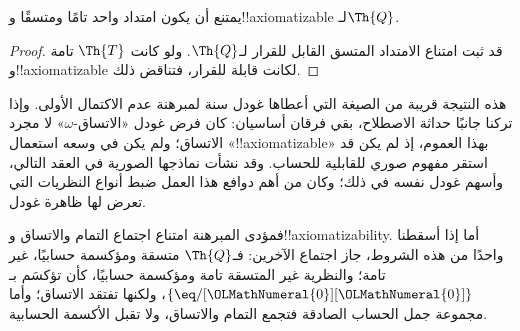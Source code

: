 \documentclass[../../../include/open-logic-section]{subfiles}
\begin{document}


\begin{thm}
يمتنع أن يكون امتداد واحد تامًا ومتسقًا و!!{axiomatizable}
لـ$\Th{Q}$.
\end{thm}

\begin{proof}
قد ثبت امتناع الامتداد المتسق القابل للقرار لـ$\Th{Q}$.
ولو كانت $\Th{T}$ تامة و!!{axiomatizable} لكانت قابلة للقرار،
فتناقض ذلك.
\end{proof}

\begin{explain}
هذه النتيجة قريبة من الصيغة التي أعطاها غودل سنة  لمبرهنة
عدم الاكتمال الأولى. وإذا تركنا جانبًا حداثة الاصطلاح، بقي فرقان
أساسيان: كان فرض غودل «الاتساق-$\omega$» لا مجرد الاتساق؛ ولم يكن
في وسعه استعمال «!!{axiomatizable}» بهذا العموم، إذ لم يكن قد
استقر مفهوم صوري للقابلية للحساب. وقد نشأت نماذجها الصورية في العقد
التالي، وأسهم غودل نفسه في ذلك؛ وكان من أهم دوافع هذا العمل ضبط
أنواع النظريات التي تعرض لها ظاهرة غودل.

فمؤدى المبرهنة امتناع اجتماع التمام والاتساق
و!!{axiomatizability}. أما إذا أسقطنا واحدًا من هذه الشروط، جاز
اجتماع الآخرين: فـ$\Th{Q}$ متسقة ومؤكسمة حسابيًا، غير تامة؛
والنظرية غير المتسقة تامة ومؤكسمة حسابيًا، كأن تؤكسَم بـ
$\{ \eq/[\OLMathNumeral{0}][\OLMathNumeral{0}] \}$، ولكنها تفتقد الاتساق؛ وأما مجموعة جمل الحساب
الصادقة فتجمع التمام والاتساق، ولا تقبل الأكسمة الحسابية.
\end{explain}
\end{document}
